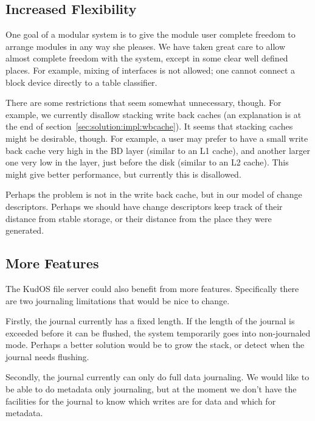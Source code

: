\subsection{Increased Flexibility}
\label{sec:future:flexibility}


One goal of a modular system is to give the module user complete freedom to
arrange modules in any way she pleases. We have taken great care to allow
almost complete freedom with the system, except in some clear well defined
places. For example, mixing of interfaces is not allowed; one cannot
connect a block device directly to a table classifier.

There are some restrictions that seem somewhat unnecessary,
though. For example, we currently disallow stacking write back caches
(an explanation is at the end of
section~\ref{sec:solution:impl:wbcache}). It seems that stacking
caches might be desirable, though. For example, a user may prefer to
have a small write back cache very high in the BD layer (similar to an
L1 cache), and another larger one very low in the layer, just before
the disk (similar to an L2 cache). This might give better performance,
but currently this is disallowed.

Perhaps the problem is not in the write back cache, but in our model of change
descriptors. Perhaps we should have change descriptors keep track of their
distance from stable storage, or their distance from the place they were
generated.

\subsection{More Features}
\label{sec:future:features}

The KudOS file server could also benefit from more features. Specifically there
are two journaling limitations that would be nice to change.

Firstly, the journal currently has a fixed length. If the length of the journal
is exceeded before it can be flushed, the system temporarily goes into non-journaled mode.
Perhaps a better solution would be to grow the stack, or detect when the
journal needs flushing.

Secondly, the journal currently can only do full data journaling. We would like
to be able to do metadata only journaling, but at the moment we don't have the
facilities for the journal to know which writes are for data and which for
metadata.
